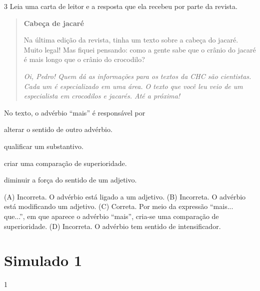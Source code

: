 \num{3} Leia uma carta de leitor e a resposta que ela recebeu por parte da revista.

\begin{quote}
\textbf{Cabeça de jacaré}

Na última edição da revista, tinha um texto sobre a cabeça do jacaré.
Muito legal! Mas fiquei pensando: como a gente sabe que o crânio do jacaré
é mais longo que o crânio do crocodilo?

\textit{Oi, Pedro! Quem dá as informações para os textos da CHC são cientistas.
Cada um é especializado em uma área. O texto que você leu veio de um
especialista em crocodilos e jacarés. Até a próxima!}

\end{quote}

No texto, o advérbio ``mais'' é responsável por

\begin{escolha}
\item alterar o sentido de outro advérbio.

\item qualificar um substantivo.

\item criar uma comparação de superioridade.

\item diminuir a força do sentido de um adjetivo.
\end{escolha}


(A) Incorreta. O advérbio está ligado a um adjetivo.
(B) Incorreta. O advérbio está modificando um adjetivo.
(C) Correta. Por meio da expressão ``mais... que...'', em que aparece o advérbio ``mais'', cria-se uma comparação de superioridade.
(D) Incorreta. O advérbio tem sentido de intensificador.


\chapter{Simulado 1}

\num{1}


